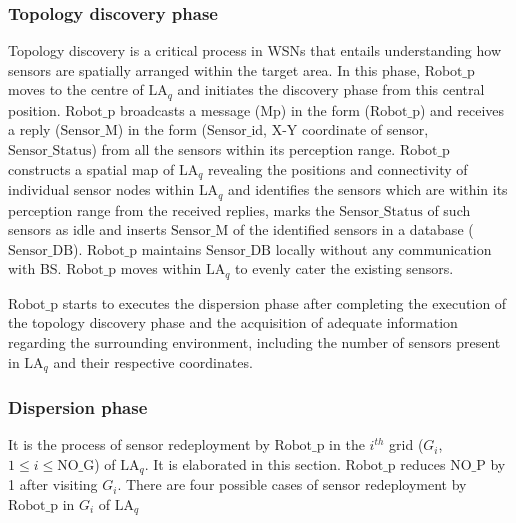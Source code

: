 \documentclass{article}
\begin{document}
\subsubsection*{Topology discovery phase}
Topology discovery is a critical process in WSNs that entails understanding how sensors are spatially arranged within the target area. In this phase, $\text{Robot\_p}$ moves to the centre of $\text{LA}_q$ and initiates the discovery phase from this central position. $\text{Robot\_p}$ broadcasts a message (Mp) in the form ($\text{Robot\_p}$) and receives a reply ($\text{Sensor\_M}$) in the form ($\text{Sensor\_id}$, X-Y coordinate of sensor, $\text{Sensor\_Status}$) from all the sensors within its perception range.
$\text{Robot\_p}$ constructs a spatial map of $\text{LA}_q$ revealing the positions and connectivity of individual sensor nodes within $\text{LA}_q$ and identifies the sensors which are within its perception range from the received replies, marks the $\text{Sensor\_Status}$ of such sensors as idle and inserts $\text{Sensor\_M}$ of the identified sensors in a database ($\text{Sensor\_DB}$). $\text{Robot\_p}$ maintains $\text{Sensor\_DB}$ locally without any communication with BS. $\text{Robot\_p}$ moves within $\text{LA}_q$ to evenly cater the existing sensors.

$\text{Robot\_p}$ starts to executes the dispersion phase after completing the execution of the topology discovery phase and the acquisition of adequate information regarding the surrounding environment, including the number of sensors present in $\text{LA}_q$ and their respective coordinates.

\subsubsection*{Dispersion phase}
It is the process of sensor redeployment by $\text{Robot\_p}$ in the $i^{th}$ grid ($G_i$, $1 \le i \le \text{NO\_G}$) of $\text{LA}_q$. It is elaborated in this section. $\text{Robot\_p}$ reduces $\text{NO\_P}$ by 1 after visiting $G_i$.
There are four possible cases of sensor redeployment by $\text{Robot\_p}$ in $G_i$ of $\text{LA}_q$
\end{document}
